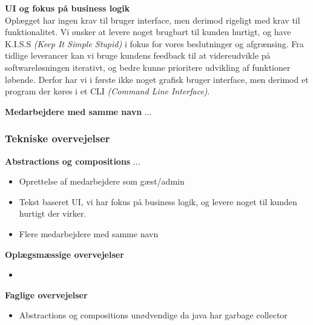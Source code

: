 \textbf{UI og fokus på business logik} \\
Oplægget har ingen krav til bruger interface, men derimod rigeligt med krav til funktionalitet. Vi ønsker at levere noget brugbart til kunden hurtigt, og have K.I.S.S \textit{(Keep It Simple Stupid)} i fokus for vores beslutninger og afgrænsing. Fra tidlige leverancer kan vi bruge kundens feedback til at videreudvikle på softwareløsningen iterativt, og bedre kunne prioritere udvikling af funktioner løbende. Derfor har vi i første ikke noget grafisk bruger interface, men derimod et program der køres i et CLI \textit{(Command Line Interface)}.

\textbf{Medarbejdere med samme navn}
...

\subsubsection{Tekniske overvejelser}

\textbf{Abstractions og compositions}
...

{\color{red}
    \begin{itemize}
        \item Oprettelse af medarbejdere som gæst/admin
        \item Tekst baseret UI, vi har fokus på business logik, og levere noget til kunden hurtigt der virker.
        \item Flere medarbejdere med samme navn
    \end{itemize}
    \textbf{Oplægsmæssige overvejelser}
    \begin{itemize}
        \item
    \end{itemize}
    \textbf{Faglige overvejelser}
    \begin{itemize}
        \item Abstractions og compositions unødvendige da java har garbage collector
    \end{itemize}
}
\newpage
